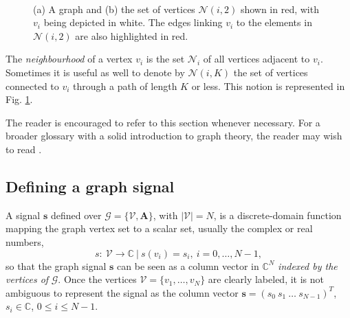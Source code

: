 \begin{figure}
	\centering
    \caption{(a) A graph and (b) the set of vertices $ \mathcal{N}(i,2) $ shown in red, with $ v_i $ being depicted in white. The edges linking $ v_i $ to the elements in $ \mathcal{N}(i,2) $ are also highlighted in red.}%
	~
	\floatsource
	\label{fig:k_hop_neighborhood}%
\end{figure}

The \emph{neighbourhood} of a vertex $ v_i $ is the set $ \mathcal{N}_i $ of all vertices adjacent to $ v_i $. Sometimes it is useful as well to denote by $ \mathcal{N}(i,K) $ the set of vertices connected to $ v_i $ through a path of length $ K $ or less. This notion is represented in Fig. \ref{fig:k_hop_neighborhood}.

The reader is encouraged to refer to this section whenever necessary. For a broader glossary with a solid introduction to graph theory, the reader may wish to read \cite{murty2008graph, chung1997spectral}.


\subsection{Defining a graph signal}

A signal $ \mathbf{s} $ defined over $ \mathcal{G} = \{\mathcal{V}, \mathbf{A}\} $, with $ |\mathcal{V}| = N $, is a discrete-domain function mapping the graph vertex set to a scalar set, usually the complex or real numbers,
\begin{equation}
\label{eq:def_signal}
s: \ \mathcal{V} \rightarrow \mathbb{C} \ | \ s(v_i) = s_i, \ i=0, \dots, N-1,
\end{equation}
so that the graph signal $ \mathbf{s} $ can be seen as a column vector in $ \mathbb{C}^N $ \emph{indexed by the vertices of} $ \mathcal{G} $. Once the vertices $ \mathcal{V} = \{v_1, \dots, v_N\}$ are clearly labeled, it is not ambiguous to represent the signal as the column vector $ \mathbf{s} = (s_0 \ s_1 \ \dots \ s_{N-1})^T$, $ s_i \in \mathbb{C} $, $ 0 \leq i \leq N-1 $.

